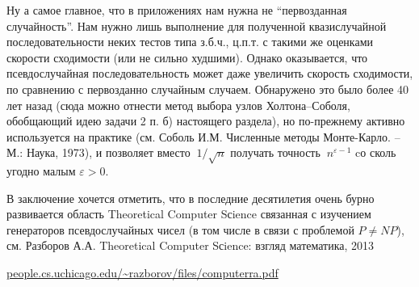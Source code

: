 \begin{problem}
\begin{remark}
Ну а самое главное, что в приложениях нам нужна не ``первозданная случайность''. Нам нужно лишь выполнение для полученной квазислучайной последовательности неких тестов типа з.б.ч., ц.п.т. с такими же оценками скорости сходимости (или не сильно худшими). Однако оказывается, что псевдослучайная последовательность может даже увеличить скорость сходимости, по сравнению с первозданно случайным случаем. Обнаружено это было более 40 лет назад (сюда можно отнести метод выбора узлов Холтона--Соболя, обобщающий идею задачи 2 п. б) настоящего раздела), но по-прежнему активно используется на практике (см. Соболь И.М. Численные методы Монте-Карло. -- М.: Наука, 1973), и позволяет вместо $~1/\sqrt{n}$ получать точность $~n^{\varepsilon - 1}$ cо сколь угодно малым $\varepsilon > 0$.


В заключение хочется отметить, что в последние десятилетия очень бурно развивается область Theoretical Computer Sсience связанная с изучением генераторов псевдослучайных чисел (в том числе в связи с проблемой $P \ne NP$), см.  
Разборов А.А. Theoretical Computer Sсience: взгляд математика, 2013

\url{people.cs.uchicago.edu/~razborov/files/computerra.pdf}

\end{remark}
\end{problem}

